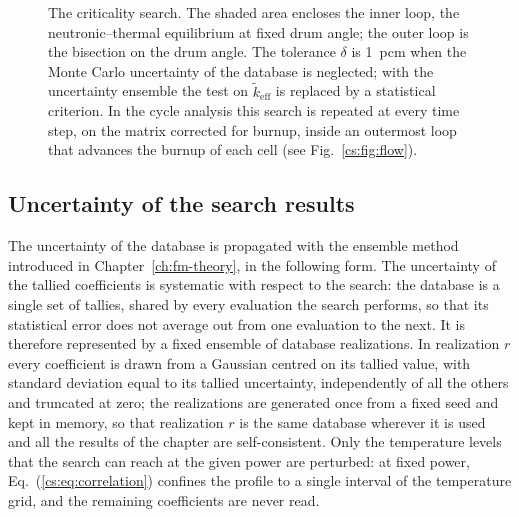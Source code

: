 \begin{figure}[htbp]
{}
  \caption[The criticality search]{The criticality search. The shaded area
  encloses the inner loop, the neutronic--thermal equilibrium at fixed drum
  angle; the outer loop is the bisection on the drum angle. The tolerance
  $\delta$ is \SI{1}{pcm} when the Monte Carlo uncertainty of the database is
  neglected; with the uncertainty ensemble the test on $\tilde k_{\mathrm{eff}}$
  is replaced by a statistical criterion. In the cycle analysis this search is
  repeated at every time step, on the matrix corrected for burnup, inside an
  outermost loop that advances the burnup of each cell (see Fig.~\ref{cs:fig:flow}).}
  \label{cs:fig:flow-search}
\end{figure}

\subsection{Uncertainty of the search results}\label{cs:sec:ensemble}

The uncertainty of the database is propagated with the ensemble method
introduced in Chapter~\ref{ch:fm-theory}, in the following form. The uncertainty of the tallied
coefficients is systematic with respect to the search: the database is a
single set of tallies, shared by every evaluation the search performs, so that
its statistical error does not average out from one evaluation to the next. It
is therefore represented
by a fixed ensemble of database realizations. In realization $r$ every
coefficient is drawn from a Gaussian centred on its tallied value, with
standard deviation equal to its tallied uncertainty, independently of all the
others and truncated at zero; the realizations are generated once from a fixed
seed and kept in memory, so that realization $r$ is the same database wherever
it is used and all the results of the chapter are self-consistent. Only the
temperature levels that the search can reach at the given power are perturbed:
at fixed power, Eq.~(\ref{cs:eq:correlation}) confines the profile to a single
interval of the temperature grid, and the remaining coefficients are never
read.

